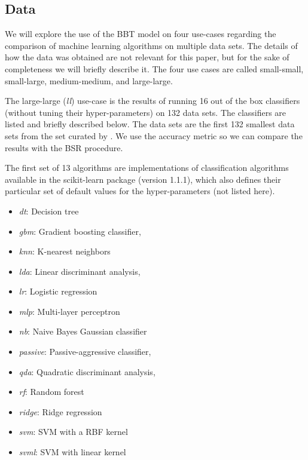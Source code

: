 \documentclass[twoside,11pt,preprint]{article}
\def\tightlist{}
\begin{document}
\hypertarget{data}{%
\subsection{\texorpdfstring{Data \label{sec:data}}{Data }}\label{data}}

We will explore the use of the BBT model on four use-cases regarding
the comparison of machine learning algorithms on multiple data sets.
The details of how the data was obtained are not relevant for this
paper, but for the sake of completeness we will briefly describe it.
The four use cases are called small-small, small-large, medium-medium,
and large-large.

The large-large (\emph{ll}) use-case is the results of running 16 out of
the box classifiers (without tuning their hyper-parameters) on 132
data sets. The classifiers are listed and briefly described
below. The data sets are the first 132 smallest data sets from the set
curated by \citet{Olson2017PMLB}. We use the accuracy metric so we can compare the results with the BSR procedure.

The first set of 13 algorithms are implementations of classification
algorithms available in the scikit-learn package \citep{scikit-learn}
(version 1.1.1), which also defines their particular set of default
values for the hyper-parameters (not listed here).

\begin{itemize}
\tightlist
\item
  \emph{dt}: Decision tree
\item
  \emph{gbm}: Gradient boosting classifier,
\item
  \emph{knn}: K-nearest neighbors
\item
  \emph{lda}: Linear discriminant analysis,
\item
  \emph{lr}: Logistic regression
\item
  \emph{mlp}: Multi-layer perceptron
\item
  \emph{nb}: Naive Bayes Gaussian classifier
\item
  \emph{passive}: Passive-aggressive classifier,
\item
  \emph{qda}: Quadratic discriminant analysis,
\item
  \emph{rf}: Random forest
\item
  \emph{ridge}: Ridge regression
\item
  \emph{svm}: SVM with a RBF kernel
\item
  \emph{svml}: SVM with linear kernel
\end{itemize}
\end{document}

